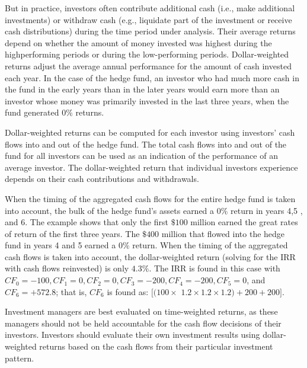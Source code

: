 \documentclass[11pt]{article}
\begin{document}
But in practice, investors often contribute additional cash (i.e., make additional investments) or withdraw cash (e.g., liquidate part of the investment or receive cash distributions) during the time period under analysis. Their average returns depend on whether the amount of money invested was highest during the highperforming periods or during the low-performing periods. Dollar-weighted returns adjust the average annual performance for the amount of cash invested each year. In the case of the hedge fund, an investor who had much more cash in the fund in the early years than in the later years would earn more than an investor whose money was primarily invested in the last three years, when the fund generated $0 \%$ returns.

Dollar-weighted returns can be computed for each investor using investors' cash flows into and out of the hedge fund. The total cash flows into and out of the fund for all investors can be used as an indication of the performance of an average investor. The dollar-weighted return that individual investors experience depends on their cash contributions and withdrawals.

When the timing of the aggregated cash flows for the entire hedge fund is taken into account, the bulk of the hedge fund's assets earned a $0 \%$ return in years 4,5 , and 6. The example shows that only the first $\$ 100$ million earned the great rates of return of the first three years. The $\$ 400$ million that flowed into the hedge fund in years 4 and 5 earned a $0 \%$ return. When the timing of the aggregated cash flows is taken into account, the dollar-weighted return (solving for the IRR with cash flows reinvested) is only $4.3 \%$. The IRR is found in this case with $C F_{0}=-100, C F_{1}=0, C F_{2}=0, C F_{3}=-200, C F_{4}=-200, C F_{5}=0$, and $C F_{6}=+572.8$; that is, $C F_{6}$ is found as: $[(100 \times$ $1.2 \times 1.2 \times 1.2)+200+200]$.

Investment managers are best evaluated on time-weighted returns, as these managers should not be held accountable for the cash flow decisions of their investors. Investors should evaluate their own investment results using dollar-weighted returns based on the cash flows from their particular investment pattern.
\end{document}
